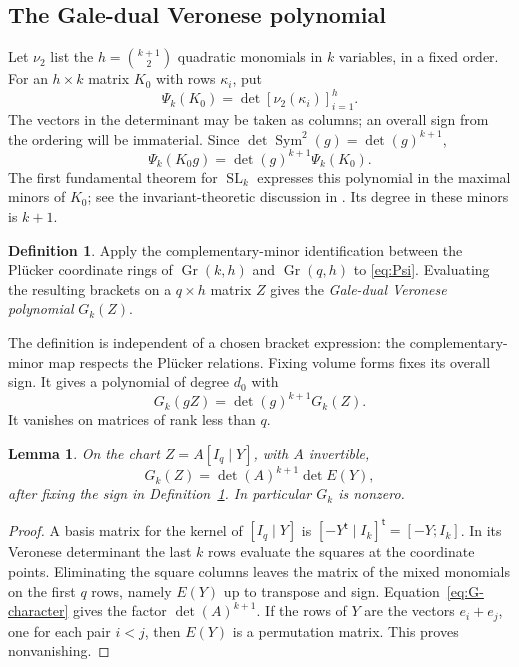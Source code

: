 \documentclass[11pt]{article}
\newtheorem{lemma}[theorem]{Lemma}
\theoremstyle{definition}
\newtheorem{definition}[theorem]{Definition}
\theoremstyle{remark}
\numberwithin{equation}{section}
\DeclareMathOperator{\Sym}{Sym}
\DeclareMathOperator{\Gr}{Gr}
\DeclareMathOperator{\SL}{SL}
\begin{document}
\subsection{The Gale-dual Veronese polynomial}

Let $\nu_2$ list the $h=\binom{k+1}{2}$ quadratic monomials in $k$
variables, in a fixed order. For an $h\times k$ matrix $K_0$ with
rows $\kappa_i$, put
\begin{equation}\label{eq:Psi}
 \Psi_k(K_0)=\det[\nu_2(\kappa_i)]_{i=1}^h.
\end{equation}
The vectors in the determinant may be taken as columns; an overall
sign from the ordering will be immaterial. Since
$\det\Sym^2(g)=\det(g)^{k+1}$,
\begin{equation}\label{eq:Psi-character}
 \Psi_k(K_0g)=\det(g)^{k+1}\Psi_k(K_0).
\end{equation}
The first fundamental theorem for $\SL_k$ expresses this polynomial
in the maximal minors of $K_0$; see the invariant-theoretic discussion
in \cite{HJPS}. Its degree in these minors is $k+1$.

\begin{definition}\label{def:Gale}
Apply the complementary-minor identification between the Pl\"ucker
coordinate rings of $\Gr(k,h)$ and $\Gr(q,h)$ to \eqref{eq:Psi}.
Evaluating the resulting brackets on a $q\times h$ matrix $Z$ gives
the \emph{Gale-dual Veronese polynomial} $G_k(Z)$.
\end{definition}

The definition is independent of a chosen bracket expression: the
complementary-minor map respects the Pl\"ucker relations. Fixing volume
forms fixes its overall sign. It gives a polynomial of degree $d_0$ with
\begin{equation}\label{eq:G-character}
 G_k(gZ)=\det(g)^{k+1}G_k(Z).
\end{equation}
It vanishes on matrices of rank less than $q$.

\begin{lemma}\label{lem:G-chart}
On the chart $Z=A[I_q\mid Y]$, with $A$ invertible,
\begin{equation}\label{eq:G-chart}
 G_k(Z)=\det(A)^{k+1}\det E(Y),
\end{equation}
after fixing the sign in Definition~\ref{def:Gale}. In particular
$G_k$ is nonzero.
\end{lemma}

\begin{proof}
A basis matrix for the kernel of $[I_q\mid Y]$ is
$[-Y^{\mathsf t}\mid I_k]^{\mathsf t}=[-Y;I_k]$.
In its Veronese determinant the last $k$ rows evaluate the squares at
the coordinate points. Eliminating the square columns leaves the
matrix of the mixed monomials on the first $q$ rows, namely $E(Y)$
up to transpose and sign. Equation~\eqref{eq:G-character} gives the
factor $\det(A)^{k+1}$. If the rows of $Y$ are the vectors
$e_i+e_j$, one for each pair $i<j$, then $E(Y)$ is a permutation
matrix. This proves nonvanishing.
\end{proof}
\end{document}

